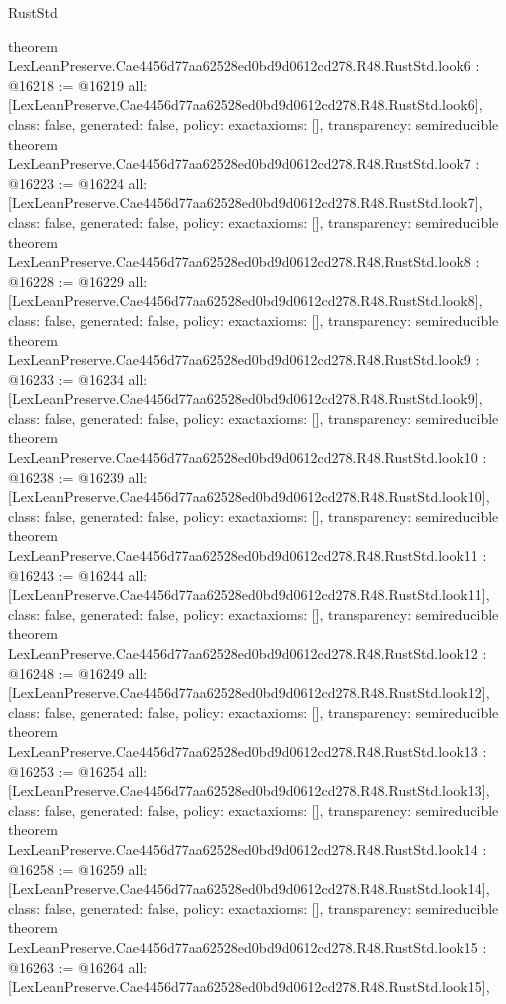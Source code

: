 \begin{lexlean}{RustStd}
\begin{coremodule}
{}
theorem LexLeanPreserve.Cae4456d77aa62528ed0bd9d0612cd278.R48.RustStd.look6 : @16218 := @16219 {
  all: [LexLeanPreserve.Cae4456d77aa62528ed0bd9d0612cd278.R48.RustStd.look6],
  class: false,
  generated: false,
  policy: exact{axioms: []},
  transparency: semireducible
}
theorem LexLeanPreserve.Cae4456d77aa62528ed0bd9d0612cd278.R48.RustStd.look7 : @16223 := @16224 {
  all: [LexLeanPreserve.Cae4456d77aa62528ed0bd9d0612cd278.R48.RustStd.look7],
  class: false,
  generated: false,
  policy: exact{axioms: []},
  transparency: semireducible
}
theorem LexLeanPreserve.Cae4456d77aa62528ed0bd9d0612cd278.R48.RustStd.look8 : @16228 := @16229 {
  all: [LexLeanPreserve.Cae4456d77aa62528ed0bd9d0612cd278.R48.RustStd.look8],
  class: false,
  generated: false,
  policy: exact{axioms: []},
  transparency: semireducible
}
theorem LexLeanPreserve.Cae4456d77aa62528ed0bd9d0612cd278.R48.RustStd.look9 : @16233 := @16234 {
  all: [LexLeanPreserve.Cae4456d77aa62528ed0bd9d0612cd278.R48.RustStd.look9],
  class: false,
  generated: false,
  policy: exact{axioms: []},
  transparency: semireducible
}
theorem LexLeanPreserve.Cae4456d77aa62528ed0bd9d0612cd278.R48.RustStd.look10 : @16238 := @16239 {
  all: [LexLeanPreserve.Cae4456d77aa62528ed0bd9d0612cd278.R48.RustStd.look10],
  class: false,
  generated: false,
  policy: exact{axioms: []},
  transparency: semireducible
}
theorem LexLeanPreserve.Cae4456d77aa62528ed0bd9d0612cd278.R48.RustStd.look11 : @16243 := @16244 {
  all: [LexLeanPreserve.Cae4456d77aa62528ed0bd9d0612cd278.R48.RustStd.look11],
  class: false,
  generated: false,
  policy: exact{axioms: []},
  transparency: semireducible
}
theorem LexLeanPreserve.Cae4456d77aa62528ed0bd9d0612cd278.R48.RustStd.look12 : @16248 := @16249 {
  all: [LexLeanPreserve.Cae4456d77aa62528ed0bd9d0612cd278.R48.RustStd.look12],
  class: false,
  generated: false,
  policy: exact{axioms: []},
  transparency: semireducible
}
theorem LexLeanPreserve.Cae4456d77aa62528ed0bd9d0612cd278.R48.RustStd.look13 : @16253 := @16254 {
  all: [LexLeanPreserve.Cae4456d77aa62528ed0bd9d0612cd278.R48.RustStd.look13],
  class: false,
  generated: false,
  policy: exact{axioms: []},
  transparency: semireducible
}
theorem LexLeanPreserve.Cae4456d77aa62528ed0bd9d0612cd278.R48.RustStd.look14 : @16258 := @16259 {
  all: [LexLeanPreserve.Cae4456d77aa62528ed0bd9d0612cd278.R48.RustStd.look14],
  class: false,
  generated: false,
  policy: exact{axioms: []},
  transparency: semireducible
}
theorem LexLeanPreserve.Cae4456d77aa62528ed0bd9d0612cd278.R48.RustStd.look15 : @16263 := @16264 {
  all: [LexLeanPreserve.Cae4456d77aa62528ed0bd9d0612cd278.R48.RustStd.look15],
}
\end{coremodule}
\end{lexlean}
